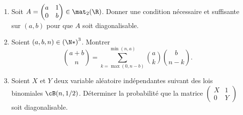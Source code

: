 \begin{enonce}
\begin{exercise}[ID={RMS127 E911},subtitle={Mines-Ponts PC 2016},tags={}]
\begin{enumerate}
  \item Soit $A= \begin{pmatrix} a&1\\0&b \end{pmatrix}\in\mat_2(\R)$.
      Donner une condition nécessaire et suffisante sur $(a,b)$ pour que $A$ soit diagonalisable.

    \item Soient $(a,b,n)\in\left( \N* \right)^3$.
      Montrer
      \begin{equation*}
        \binom{a+b}{n} = \sum_{k=\max(0, n-b)}^{\min(n,a)} \binom ak \binom{b}{n-k}.
      \end{equation*}

    \item Soient $X$ et $Y$ deux variable aléatoire indépendantes suivant des lois binomiales $\cB(n, 1/2)$.
      Déterminer la probabilité que la matrice $\begin{pmatrix} X&1\\ 0&Y \end{pmatrix}$ soit diagonalisable.  
\end{enumerate}
\end{exercise}
\begin{solution}
\end{solution}
\end{enonce}
